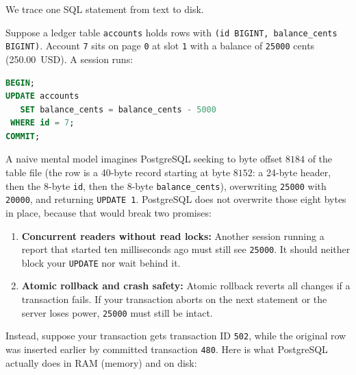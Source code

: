 We trace one SQL statement from text to disk.

Suppose a ledger table \texttt{accounts} holds rows with \texttt{(id BIGINT, balance\_cents BIGINT)}. Account \texttt{7} sits on page \texttt{0} at slot \texttt{1} with a balance of \texttt{25000} cents (250.00~USD). A session runs:

\begin{lstlisting}[language=SQL]
BEGIN;
UPDATE accounts
   SET balance_cents = balance_cents - 5000
 WHERE id = 7;
COMMIT;
\end{lstlisting}

A naive mental model imagines PostgreSQL seeking to byte offset $8184$ of the table file (the row is a 40-byte record starting at byte $8152$: a 24-byte header, then the 8-byte \texttt{id}, then the 8-byte \texttt{balance\_cents}), overwriting \texttt{25000} with \texttt{20000}, and returning \texttt{UPDATE 1}. PostgreSQL does not overwrite those eight bytes in place, because that would break two promises:

\begin{enumerate}
  \item \textbf{Concurrent readers without read locks:} Another session running a report that started ten milliseconds ago must still see \texttt{25000}. It should neither block your \texttt{UPDATE} nor wait behind it.
  \item \textbf{Atomic rollback and crash safety:} Atomic rollback reverts all changes if a transaction fails. If your transaction aborts on the next statement or the server loses power, \texttt{25000} must still be intact.
\end{enumerate}

Instead, suppose your transaction gets transaction ID \texttt{502}, while the original row was inserted earlier by committed transaction \texttt{480}. Here is what PostgreSQL actually does in RAM (memory) and on disk:

